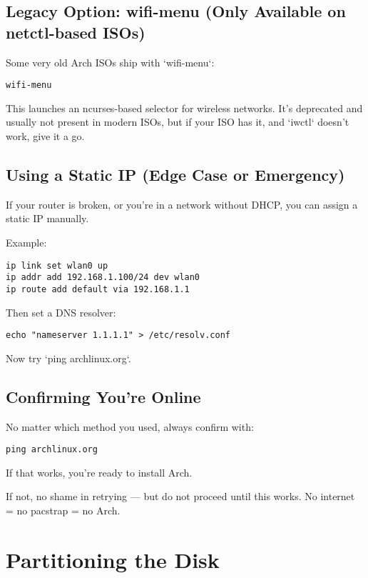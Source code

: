 \documentclass[12pt]{book}
\begin{document}
\section{Legacy Option: wifi-menu (Only Available on netctl-based ISOs)}

Some very old Arch ISOs ship with `wifi-menu`:

\begin{lstlisting}
wifi-menu
\end{lstlisting}

This launches an ncurses-based selector for wireless networks. It’s deprecated and usually not present in modern ISOs, but if your ISO has it, and `iwctl` doesn’t work, give it a go.

\section{Using a Static IP (Edge Case or Emergency)}

If your router is broken, or you’re in a network without DHCP, you can assign a static IP manually.

Example:

\begin{lstlisting}
ip link set wlan0 up
ip addr add 192.168.1.100/24 dev wlan0
ip route add default via 192.168.1.1
\end{lstlisting}

Then set a DNS resolver:

\begin{lstlisting}
echo "nameserver 1.1.1.1" > /etc/resolv.conf
\end{lstlisting}

Now try `ping archlinux.org`.

\section{Confirming You’re Online}

No matter which method you used, always confirm with:

\begin{lstlisting}
ping archlinux.org
\end{lstlisting}

If that works, you're ready to install Arch.

If not, no shame in retrying — but do not proceed until this works. No internet = no pacstrap = no Arch.

\clearpage

\chapter{Partitioning the Disk}
\end{document}
